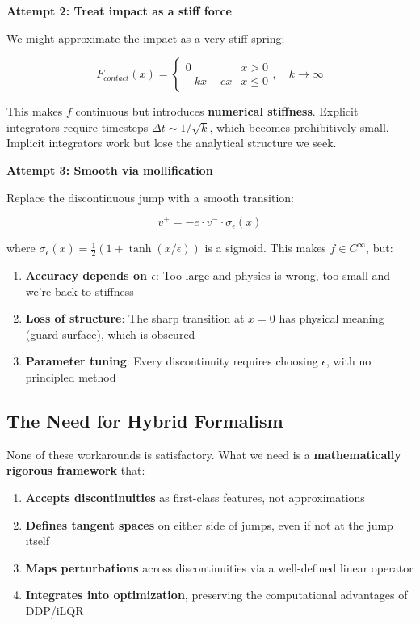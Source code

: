 \documentclass[
  letterpaper,
  DIV=11,
  numbers=noendperiod]{scrartcl}
\providecommand{\tightlist}{%
  \setlength{\itemsep}{0pt}\setlength{\parskip}{0pt}}\usepackage{longtable,booktabs,array}
\begin{document}
\textbf{Attempt 2: Treat impact as a stiff force}

We might approximate the impact as a very stiff spring:

\[
F_{contact}(x) = \begin{cases}
0 & x > 0 \\
-k x - c \dot{x} & x \leq 0
\end{cases}, \quad k \to \infty
\]

This makes \(f\) continuous but introduces \textbf{numerical stiffness}.
Explicit integrators require timesteps \(\Delta t \sim 1/\sqrt{k}\),
which becomes prohibitively small. Implicit integrators work but lose
the analytical structure we seek.

\textbf{Attempt 3: Smooth via mollification}

Replace the discontinuous jump with a smooth transition:

\[
v^+ = -e \cdot v^- \cdot \sigma_\epsilon(x)
\]

where \(\sigma_\epsilon(x) = \frac{1}{2}(1 + \tanh(x/\epsilon))\) is a
sigmoid. This makes \(f \in C^\infty\), but:

\begin{enumerate}
\def\labelenumi{\arabic{enumi}.}
\tightlist
\item
  \textbf{Accuracy depends on \(\epsilon\)}: Too large and physics is
  wrong, too small and we're back to stiffness
\item
  \textbf{Loss of structure}: The sharp transition at \(x = 0\) has
  physical meaning (guard surface), which is obscured
\item
  \textbf{Parameter tuning}: Every discontinuity requires choosing
  \(\epsilon\), with no principled method
\end{enumerate}

\subsection{The Need for Hybrid
Formalism}\label{the-need-for-hybrid-formalism}

None of these workarounds is satisfactory. What we need is a
\textbf{mathematically rigorous framework} that:

\begin{enumerate}
\def\labelenumi{\arabic{enumi}.}
\tightlist
\item
  \textbf{Accepts discontinuities} as first-class features, not
  approximations
\item
  \textbf{Defines tangent spaces} on either side of jumps, even if not
  at the jump itself
\item
  \textbf{Maps perturbations} across discontinuities via a well-defined
  linear operator
\item
  \textbf{Integrates into optimization}, preserving the computational
  advantages of DDP/iLQR
\end{enumerate}
\end{document}
